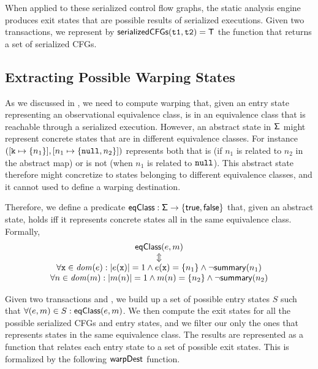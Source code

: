 When applied to these serialized control flow graphs, the static analysis engine produces exit states that are possible results of serialized executions. Given two transactions, we represent by $\mathsf{serializedCFGs}(\mathtt{t1}, \mathtt{t2})=\mathsf{T}$ the function that returns a set of serialized CFGs.

\subsection{Extracting Possible Warping States}
As we discussed in , we need to compute warping that, given an entry state representing an observational equivalence class, is in an equivalence class that is reachable through a serialized execution. However, an abstract state in $\mathsf{\Sigma}$ might represent concrete states that are in different equivalence classes. For instance $([\mathtt{k} \mapsto \{n_1\}], [n_1 \mapsto \{\mathtt{null}, n_2\}])$ represents both that   is (if $n_1$ is related to $n_2$ in the abstract map) or is not (when $n_1$ is related to $\mathtt{null}$). This abstract state therefore might concretize to states belonging to different equivalence classes, and it cannot used to define a warping destination.

Therefore, we define a predicate $\mathsf{eqClass} : \mathsf{\Sigma} \to \{\mathsf{true}, \mathsf{false}\}$ that, given an abstract state, holds iff it represents concrete states all in the same equivalence class. Formally,
\[
\begin{array}{c}
\mathsf{eqClass}(e, m)\\
\Updownarrow\\
\forall \mathtt{x} \in \mathit{dom}(e) : |e(\mathtt{x})|=1 \land e(\mathtt{x})=\{n_1\} \land \neg \mathsf{summary}(n_1)\\
\forall n \in \mathit{dom}(m) : |m(n)|=1 \land m(n)=\{n_2\} \land \neg \mathsf{summary}(n_2)\\
\end{array}
\]


Given two transactions  and , we build up a set of possible entry states $S$ such that $\forall (e, m) \in S : \mathsf{eqClass}(e, m)$. We then compute the exit states for all the possible serialized CFGs and entry states, and we filter our only the ones that represents states in the same equivalence class. The results are represented as a function that relates each entry state to a set of possible exit states. This is formalized by the following $\mathsf{warpDest}$ function.


